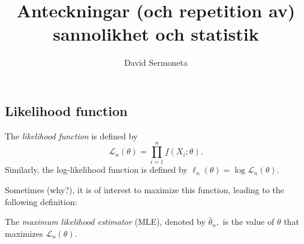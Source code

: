 \documentclass{article}
\title{Anteckningar (och repetition av) sannolikhet och statistik}
\author{David Sermoneta}
\theoremstyle{definition}
\theoremstyle{definition}
\theoremstyle{definition}
\theoremstyle{definition}
\begin{document}
\maketitle

\subsection*{Likelihood function}
\begin{definition}
The \textit{likelihood function} is defined by \[
\mathcal{L}_{n} (\theta) = \prod_{i=1}^{n} f(X_{i} ; \theta) .
\] 
Similarly, the log-likelihood function is defined by $\ell_{n} (\theta) = \log
\mathcal{L}_{n}(\theta)$. 
\end{definition}

Sometimes (why?), it is of interest to maximize this function, leading to the following definition: 
\begin{definition}
 The \textit{maximum likelihood estimator} (MLE), denoted by $\hat{\theta}_{n},$ is the value of $\theta$ that maximizes $\mathcal{L}_{n}(\theta)$.
\end{definition}
\end{document}
